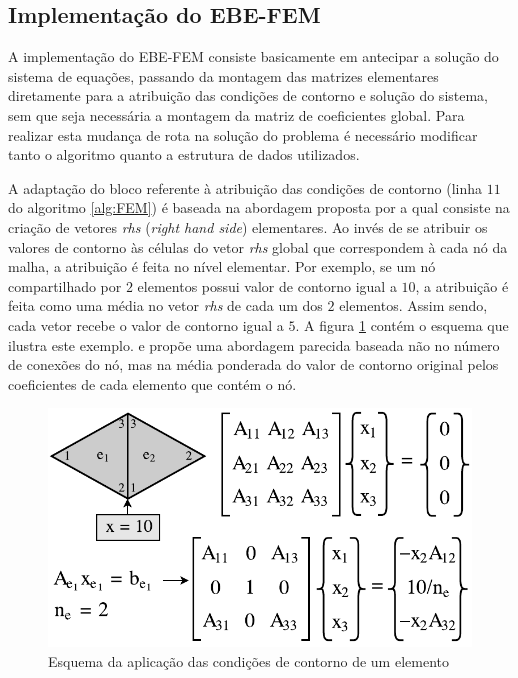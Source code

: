 \documentclass[
    12pt,               %
    openright,          %
    oneside,
    a4paper,            %
    english,            %
    french,             %
    spanish,            %
    brazil              %
    ]{abntex2}
\begin{document}
\subsection{Implementação do EBE-FEM}
A implementação do EBE-FEM consiste basicamente em antecipar a solução do sistema de equações, passando da montagem das matrizes elementares diretamente para a atribuição das condições de contorno e solução do sistema, sem que seja necessária a montagem da matriz de coeficientes global. Para realizar esta mudança de rota na solução do problema é necessário modificar tanto o algoritmo quanto a estrutura de dados utilizados.

A adaptação do bloco referente à atribuição das condições de contorno (linha $11$ do algoritmo \ref{alg:FEM}) é baseada na abordagem proposta por   a qual consiste na criação de vetores \textit{rhs} (\textit{right hand side}) elementares. Ao invés de se atribuir os valores de contorno às células do vetor \textit{rhs} global que correspondem à cada nó da malha, a atribuição é feita no nível elementar. Por exemplo, se um nó compartilhado por $2$ elementos possui valor de contorno igual a $10$, a atribuição é feita como uma média no vetor \textit{rhs} de cada um dos $2$ elementos. Assim sendo, cada vetor recebe o valor de contorno igual a $5$. A figura \ref{fig:contornoEBE} contém o esquema que ilustra este exemplo.  e  propõe uma abordagem parecida baseada não no número de conexões do nó, mas na média ponderada do valor de contorno original pelos coeficientes de cada elemento que contém o nó. 

\begin{figure}[!htb]
	\centering
	\includegraphics[scale=0.8]{figuras/contorno.pdf}
	\caption{Esquema da aplicação das condições de contorno de um elemento}
	\label{fig:contornoEBE}
\end{figure}
\end{document}
